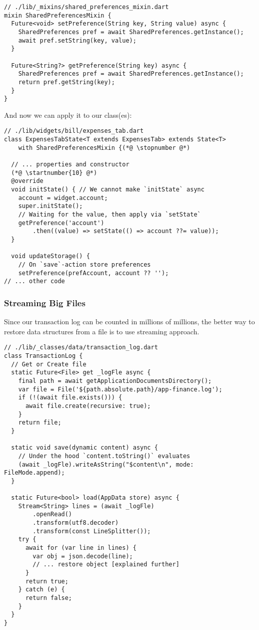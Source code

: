 \begin{lstlisting}
// ./lib/_mixins/shared_preferences_mixin.dart
mixin SharedPreferencesMixin {
  Future<void> setPreference(String key, String value) async {
    SharedPreferences pref = await SharedPreferences.getInstance();
    await pref.setString(key, value);
  }

  Future<String?> getPreference(String key) async {
    SharedPreferences pref = await SharedPreferences.getInstance();
    return pref.getString(key);
  }
}
\end{lstlisting}

\noindent And now we can apply it to our class(es):

\begin{lstlisting}
// ./lib/widgets/bill/expenses_tab.dart
class ExpensesTabState<T extends ExpensesTab> extends State<T>
    with SharedPreferencesMixin {(*@ \stopnumber @*)

  // ... properties and constructor
  (*@ \startnumber{10} @*)
  @override
  void initState() { // We cannot make `initState` async
    account = widget.account;
    super.initState();
    // Waiting for the value, then apply via `setState`
    getPreference('account')
        .then((value) => setState(() => account ??= value));
  }

  void updateStorage() {
    // On `save`-action store preferences
    setPreference(prefAccount, account ?? '');
// ... other code
\end{lstlisting}


\subsubsection{Streaming Big Files}

Since our transaction log can be counted in millions of millions, the better way to restore data structures from a file
is to use streaming approach.

\begin{lstlisting}
// ./lib/_classes/data/transaction_log.dart
class TransactionLog {
  // Get or Create file
  static Future<File> get _logFle async {
    final path = await getApplicationDocumentsDirectory();
    var file = File('${path.absolute.path}/app-finance.log');
    if (!(await file.exists())) {
      await file.create(recursive: true);
    }
    return file;
  }

  static void save(dynamic content) async {
    // Under the hood `content.toString()` evaluates
    (await _logFle).writeAsString("$content\n", mode: FileMode.append);
  }

  static Future<bool> load(AppData store) async {
    Stream<String> lines = (await _logFle)
        .openRead()
        .transform(utf8.decoder)
        .transform(const LineSplitter());
    try {
      await for (var line in lines) {
        var obj = json.decode(line);
        // ... restore object [explained further]
      }
      return true;
    } catch (e) {
      return false;
    }
  }
}
\end{lstlisting}

